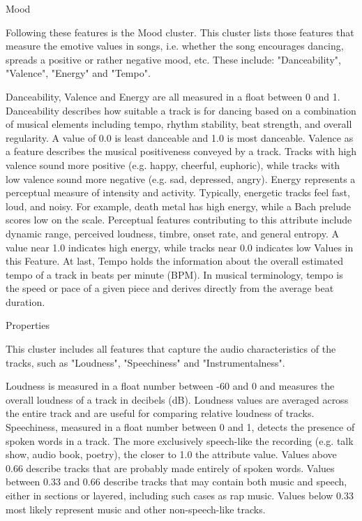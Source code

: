 Mood

Following these features is the Mood cluster. This cluster lists those features that measure the emotive values in songs, 
i.e. whether the song encourages dancing, spreads a positive or rather negative mood, etc. These include: "Danceability", "Valence", "Energy" and "Tempo".

Danceability, Valence and Energy are all measured in a float between 0 and 1. 
Danceability describes how suitable a track is for dancing based on a combination of musical elements including tempo, rhythm stability, beat strength, and overall regularity. 
A value of 0.0 is least danceable and 1.0 is most danceable. Valence as a feature describes the musical positiveness conveyed by a track. 
Tracks with high valence sound more positive (e.g. happy, cheerful, euphoric), while tracks with low valence sound more negative (e.g. sad, depressed, angry).  
Energy represents a perceptual measure of intensity and activity. Typically, energetic tracks feel fast, loud, and noisy. 
For example, death metal has high energy, while a Bach prelude scores low on the scale. Perceptual features contributing to this attribute include dynamic range, 
perceived loudness, timbre, onset rate, and general entropy. A value near 1.0 indicates high energy, while tracks near 0.0 indicates low Values in this Feature. 
At last, Tempo holds the information about the overall estimated tempo of a track in beats per minute (BPM). 
In musical terminology, tempo is the speed or pace of a given piece and derives directly from the average beat duration.

Properties

This cluster includes all features that capture the audio characteristics of the tracks, such as "Loudness", "Speechiness" and "Instrumentalness".

Loudness is measured in a float number between -60 and 0 and measures the overall loudness of a track in decibels (dB). 
Loudness values are averaged across the entire track and are useful for comparing relative loudness of tracks. 
Speechiness, measured in a float number between 0 and 1, detects the presence of spoken words in a track. 
The more exclusively speech-like the recording (e.g. talk show, audio book, poetry), the closer to 1.0 the attribute value. 
Values above 0.66 describe tracks that are probably made entirely of spoken words. Values between 0.33 and 0.66 describe tracks that may contain both music and speech, 
either in sections or layered, including such cases as rap music. Values below 0.33 most likely represent music and other non-speech-like tracks. 

